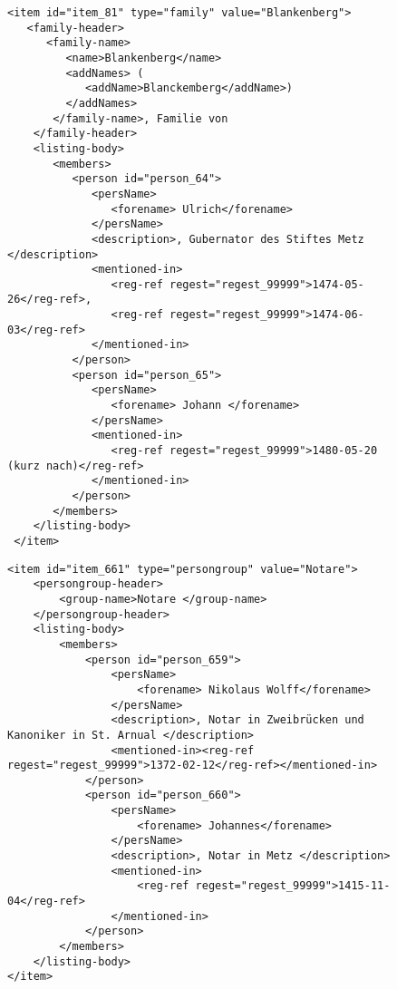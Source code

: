 \begin{figure}
\begin{verbatim}
<item id="item_81" type="family" value="Blankenberg">
   <family-header>
      <family-name>
         <name>Blankenberg</name>
         <addNames> (
            <addName>Blanckemberg</addName>)
         </addNames>
       </family-name>, Familie von 
    </family-header>
    <listing-body>
       <members>
          <person id="person_64">
             <persName>
                <forename> Ulrich</forename>
             </persName>
             <description>, Gubernator des Stiftes Metz </description>
             <mentioned-in>
                <reg-ref regest="regest_99999">1474-05-26</reg-ref>, 
                <reg-ref regest="regest_99999">1474-06-03</reg-ref>
             </mentioned-in>
          </person>
          <person id="person_65">
             <persName>
                <forename> Johann </forename>
             </persName>
             <mentioned-in>
                <reg-ref regest="regest_99999">1480-05-20 (kurz nach)</reg-ref>
             </mentioned-in>
          </person>
       </members>
    </listing-body>
 </item>
\end{verbatim}
\end{figure}

\begin{figure}
\begin{verbatim}
<item id="item_661" type="persongroup" value="Notare">
    <persongroup-header>
        <group-name>Notare </group-name>
    </persongroup-header>
    <listing-body>
        <members>
            <person id="person_659">
                <persName>
                    <forename> Nikolaus Wolff</forename>
                </persName>
                <description>, Notar in Zweibrücken und Kanoniker in St. Arnual </description>
                <mentioned-in><reg-ref regest="regest_99999">1372-02-12</reg-ref></mentioned-in>
            </person>
            <person id="person_660">
                <persName>
                    <forename> Johannes</forename>
                </persName>
                <description>, Notar in Metz </description>
                <mentioned-in>
                    <reg-ref regest="regest_99999">1415-11-04</reg-ref>
                </mentioned-in>
            </person>
        </members>
    </listing-body>
</item>
\end{verbatim}
\end{figure}

